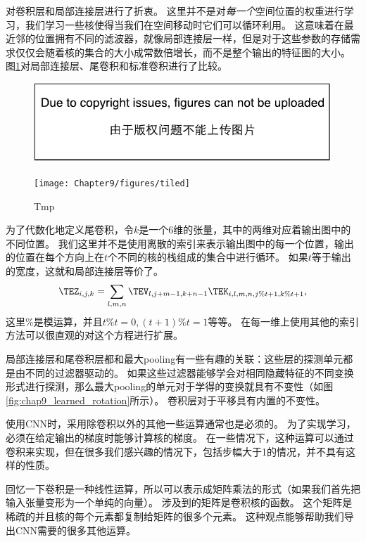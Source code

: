 \citep{Gregor+LeCun-2010,Le2010}对卷积层和局部连接层进行了折衷。
这里并不是对\emph{每一个}空间位置的权重进行学习，我们学习一些核使得当我们在空间移动时它们可以循环利用。
这意味着在最近邻的位置拥有不同的滤波器，就像局部连接层一样，但是对于这些参数的存储需求仅仅会随着核的集合的大小成常数倍增长，而不是整个输出的特征图的大小。
图\ref{fig:chap9_tiled}对局部连接层、尾卷积和标准卷积进行了比较。
\begin{figure}[!htb]
\ifOpenSource
\centerline{\includegraphics{figure.pdf}}
\else
\centerline{\texttt{[image: Chapter9/figures/tiled]}}
\fi
\caption{Tmp}
\label{fig:chap9_tiled}
\end{figure}
 
 
为了代数化地定义尾卷积，令$k$是一个6维的张量，其中的两维对应着输出图中的不同位置。
我们这里并不是使用离散的索引来表示输出图中的每一个位置，输出的位置在每个方向上在$t$个不同的核的栈组成的集合中进行循环。
如果$t$等于输出的宽度，这就和局部连接层等价了。
\begin{equation}
\TEZ_{i, j, k} = \sum_{l, m, n} \TEV_{l, j+m-1, k+n-1} \TEK_{i, l, m, n, j\% t +1, k\% t+1},
\end{equation}
这里$\%$是模运算，并且$t\% t =0, (t+1)\% t = 1$等等。
在每一维上使用其他的索引方法可以很直观的对这个方程进行扩展。
 
  
 
局部连接层和尾卷积层都和最大\gls{pooling}有一些有趣的关联：这些层的探测单元都是由不同的过滤器驱动的。
如果这些过滤器能够学会对相同隐藏特征的不同变换形式进行探测，那么最大\gls{pooling}的单元对于学得的变换就具有不变性（如图\ref{fig:chap9_learned_rotation}所示）。
卷积层对于平移具有内置的不变性。
 
 
使用\gls{CNN}时，采用除卷积以外的其他一些运算通常也是必须的。
为了实现学习，必须在给定输出的梯度时能够计算核的梯度。
在一些情况下，这种运算可以通过卷积来实现，但在很多我们感兴趣的情况下，包括步幅大于1的情况，并不具有这样的性质。

回忆一下卷积是一种线性运算，所以可以表示成矩阵乘法的形式（如果我们首先把输入张量变形为一个单纯的向量）。
涉及到的矩阵是卷积核的函数。
这个矩阵是稀疏的并且核的每个元素都复制给矩阵的很多个元素。
这种观点能够帮助我们导出\gls{CNN}需要的很多其他运算。

